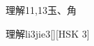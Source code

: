 \begin{entry}{理解}{11,13}{⽟、⾓}
  \begin{phonetics}{理解}{li3jie3}[][HSK 3]
  \end{phonetics}
\end{entry}
